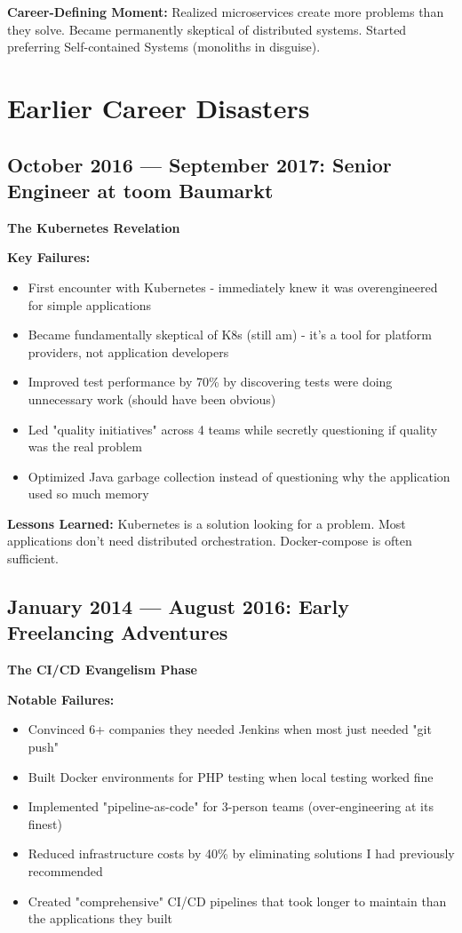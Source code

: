 \documentclass[10pt,a4paper]{article}
\begin{document}
\textbf{Career-Defining Moment:} Realized microservices create more problems than they solve. Became permanently skeptical of distributed systems. Started preferring Self-contained Systems (monoliths in disguise).

\section{Earlier Career Disasters}

\subsection{October 2016 — September 2017: Senior Engineer at toom Baumarkt}
\textbf{The Kubernetes Revelation}

\textbf{Key Failures:}
\begin{itemize}[leftmargin=*,itemsep=1pt]
    \item First encounter with Kubernetes - immediately knew it was overengineered for simple applications
    \item Became fundamentally skeptical of K8s (still am) - it's a tool for platform providers, not application developers
    \item Improved test performance by 70\% by discovering tests were doing unnecessary work (should have been obvious)
    \item Led "quality initiatives" across 4 teams while secretly questioning if quality was the real problem
    \item Optimized Java garbage collection instead of questioning why the application used so much memory
\end{itemize}

\textbf{Lessons Learned:} Kubernetes is a solution looking for a problem. Most applications don't need distributed orchestration. Docker-compose is often sufficient.

\subsection{January 2014 — August 2016: Early Freelancing Adventures}
\textbf{The CI/CD Evangelism Phase}

\textbf{Notable Failures:}
\begin{itemize}[leftmargin=*,itemsep=1pt]
    \item Convinced 6+ companies they needed Jenkins when most just needed "git push"
    \item Built Docker environments for PHP testing when local testing worked fine
    \item Implemented "pipeline-as-code" for 3-person teams (over-engineering at its finest)
    \item Reduced infrastructure costs by 40\% by eliminating solutions I had previously recommended
    \item Created "comprehensive" CI/CD pipelines that took longer to maintain than the applications they built
\end{itemize}
\end{document}
